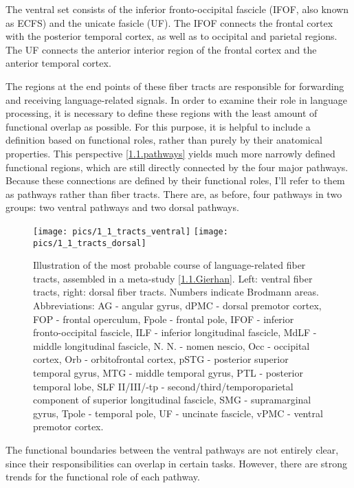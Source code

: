 The ventral set consists of the inferior fronto-occipital fascicle (IFOF, also known as ECFS) and the unicate fasicle (UF).
The IFOF connects the frontal cortex with the posterior temporal cortex, as well as to occipital and parietal regions.
The UF connects the anterior interior region of the frontal cortex and the anterior temporal cortex.

The regions at the end points of these fiber tracts are responsible for forwarding and receiving language-related signals.
In order to examine their role in language processing, it is necessary to define these regions with the least amount of functional overlap as possible.
For this purpose, it is helpful to include a definition based on functional roles, rather than purely by their anatomical properties.
This perspective \ref{1.1.pathways} yields much more narrowly defined functional regions, which are still directly connected by the four major pathways.
Because these connections are defined by their functional roles, I'll refer to them as pathways rather than fiber tracts.
There are, as before, four pathways in two groups: two ventral pathways and two dorsal pathways.

\clearpage

\begin{figure}[h]
\begin{center}
\vspace{7mm}
\texttt{[image: pics/1\_1\_tracts\_ventral]}
\texttt{[image: pics/1\_1\_tracts\_dorsal]}
\caption{\label{1.1.tracts}Illustration of the most probable course of language-related fiber tracts, assembled in a meta-study \ref{1.1.Gierhan}. Left: ventral fiber tracts, right: dorsal fiber tracts. Numbers indicate Brodmann areas. Abbreviations: AG - angular gyrus, dPMC - dorsal premotor cortex, FOP - frontal operculum, Fpole - frontal pole, IFOF - inferior fronto-occipital fascicle, ILF - inferior longitudinal fascicle, MdLF - middle longitudinal fascicle, N. N. - nomen nescio, Occ - occipital cortex, Orb - orbitofrontal cortex, pSTG - posterior superior temporal gyrus, MTG - middle temporal gyrus, PTL - posterior temporal lobe, SLF II/III/-tp - second/third/temporoparietal component of superior longitudinal fascicle, SMG - supramarginal gyrus, Tpole - temporal pole, UF - uncinate fascicle, vPMC - ventral premotor cortex.}
\end{center}
\end{figure}

The functional boundaries between the ventral pathways are not entirely clear, since their responsibilities can overlap in certain tasks.
However, there are strong trends for the functional role of each pathway.

